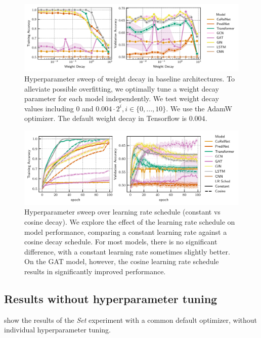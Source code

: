 \begin{figure}[H]
    \includegraphics{figs/experiments/contains_set_weight_decay_exploration_adamw-lr_none-trainval.pdf}
    \caption{Hyperparameter sweep of weight decay in baseline architectures. To alleviate possible overfitting, we optimally tune a weight decay parameter for each model independently. We test weight decay values including $0$ and $0.004 \cdot 2^{i}, i \in \{0, ..., 10\}$. We use the AdamW optimizer. The default weight decay in Tensorflow is $0.004$. }\label{fig:hyperparameter_sweep_weight_decay}
\end{figure}

\begin{figure}[H]
    \includegraphics{figs/experiments/contains_set_lr_sched_exploration_adamw-wt_dec0.032.pdf}
    \caption{Hyperparameter sweep over learning rate schedule (constant vs cosine decay). We explore the effect of the learning rate schedule on model performance, comparing a constant learning rate against a cosine decay schedule. For most models, there is no significant difference, with a constant learning rate sometimes slightly better. On the GAT model, however, the cosine learning rate schedule results in significantly improved performance.}\label{fig:hyperparameter_sweep_lr_sched}
\end{figure}

\subsection{Results without hyperparameter tuning}\label{ssec:set_no_hyperparameter_sweep}

 show the results of the \textit{Set} experiment with a common default optimizer, without individual hyperparameter tuning.


